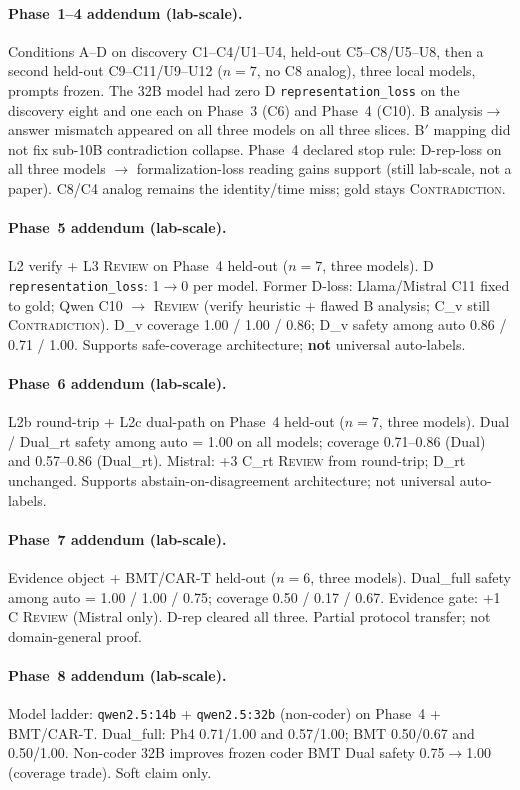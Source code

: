 \documentclass[11pt,a4paper]{article}
\newcommand{\con}{\textsc{Contradiction}}
\newcommand{\rev}{\textsc{Review}}
\begin{document}
\paragraph{Phase~1--4 addendum (lab-scale).}
Conditions A--D on discovery C1--C4/U1--U4, held-out C5--C8/U5--U8, then a second held-out C9--C11/U9--U12 ($n=7$, no C8 analog), three local models, prompts frozen.
The 32B model had zero D \texttt{representation\_loss} on the discovery eight and one each on Phase~3 (C6) and Phase~4 (C10).
B analysis$\rightarrow$answer mismatch appeared on all three models on all three slices.
B$'$ mapping did not fix sub-10B contradiction collapse.
Phase~4 declared stop rule: D-rep-loss on all three models $\rightarrow$ formalization-loss reading gains support (still lab-scale, not a paper).
C8/C4 analog remains the identity/time miss; gold stays \con{}.

\paragraph{Phase~5 addendum (lab-scale).}
L2 verify + L3 \rev{} on Phase~4 held-out ($n=7$, three models).
D \texttt{representation\_loss}: 1$\rightarrow$0 per model.
Former D-loss: Llama/Mistral C11 fixed to gold; Qwen C10 $\rightarrow$ \rev{} (verify heuristic + flawed B analysis; C\_v still \con).
D\_v coverage 1.00 / 1.00 / 0.86; D\_v safety among auto 0.86 / 0.71 / 1.00.
Supports safe-coverage architecture; \textbf{not} universal auto-labels.
\paragraph{Phase~6 addendum (lab-scale).}
L2b round-trip + L2c dual-path on Phase~4 held-out ($n=7$, three models).
Dual / Dual\_rt safety among auto = 1.00 on all models; coverage 0.71--0.86 (Dual) and 0.57--0.86 (Dual\_rt).
Mistral: +3 C\_rt \rev{} from round-trip; D\_rt unchanged.
Supports abstain-on-disagreement architecture; not universal auto-labels.

\paragraph{Phase~7 addendum (lab-scale).}
Evidence object + BMT/CAR-T held-out ($n=6$, three models).
Dual\_full safety among auto = 1.00 / 1.00 / 0.75; coverage 0.50 / 0.17 / 0.67.
Evidence gate: +1 C \rev{} (Mistral only). D-rep cleared all three.
Partial protocol transfer; not domain-general proof.

\paragraph{Phase~8 addendum (lab-scale).}
Model ladder: \texttt{qwen2.5:14b} + \texttt{qwen2.5:32b} (non-coder) on Phase~4 + BMT/CAR-T.
Dual\_full: Ph4 0.71/1.00 and 0.57/1.00; BMT 0.50/0.67 and 0.50/1.00.
Non-coder 32B improves frozen coder BMT Dual safety 0.75$\rightarrow$1.00 (coverage trade). Soft claim only.
\end{document}
